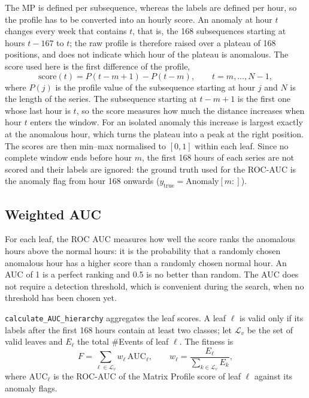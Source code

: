 The \ac{MP} is defined per subsequence, whereas the labels are defined per hour, so the profile has to be converted into an hourly score.
An anomaly at hour $t$ changes every week that contains $t$, that is, the 168 subsequences starting at hours $t - 167$ to $t$; the raw profile is therefore raised over a plateau of 168 positions, and does not indicate which hour of the plateau is anomalous.
The score used here is the first difference of the profile,
\begin{equation}
    \mathrm{score}(t) = P(t - m + 1) - P(t - m), \qquad t = m, \dots, N - 1,
    \label{eq:mp-score}
\end{equation}
where $P(j)$ is the profile value of the subsequence starting at hour $j$ and $N$ is the length of the series.
The subsequence starting at $t - m + 1$ is the first one whose last hour is $t$, so the score measures how much the distance increases when hour $t$ enters the window.
For an isolated anomaly this increase is largest exactly at the anomalous hour, which turns the plateau into a peak at the right position.
The scores are then min--max normalised to $[0, 1]$ within each leaf.
Since no complete window ends before hour $m$, the first 168 hours of each series are not scored and their labels are ignored: the ground truth used for the ROC-AUC is the anomaly flag from hour 168 onwards ($y_{\text{true}} = \text{Anomaly}[m{:}]$).

\subsection{Weighted AUC}

For each leaf, the \ac{ROC} \ac{AUC} measures how well the score ranks the anomalous hours above the normal hours: it is the probability that a randomly chosen anomalous hour has a higher score than a randomly chosen normal hour.
An \ac{AUC} of 1 is a perfect ranking and 0.5 is no better than random.
The \ac{AUC} does not require a detection threshold, which is convenient during the search, when no threshold has been chosen yet.

\texttt{calculate\_AUC\_hierarchy} aggregates the leaf scores.
A leaf $\ell$ is valid only if its labels after the first 168 hours contain at least two classes; let $\mathcal{L}_v$ be the set of valid leaves and $E_\ell$ the total \#Events of leaf $\ell$.
The fitness is
\begin{equation}
    F = \sum_{\ell \in \mathcal{L}_v} w_\ell \, \mathrm{AUC}_\ell,
    \qquad
    w_\ell = \frac{E_\ell}{\sum_{k \in \mathcal{L}_v} E_k},
    \label{eq:weighted-auc-ch4}
\end{equation}
where $\mathrm{AUC}_\ell$ is the ROC-AUC of the Matrix Profile score of leaf $\ell$ against its anomaly flags.

